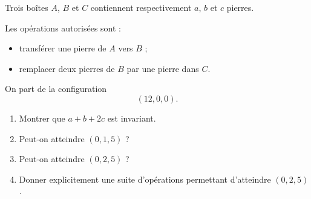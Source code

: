 Trois boîtes $A$, $B$ et $C$ contiennent respectivement $a$, $b$ et $c$
pierres.

Les opérations autorisées sont :
\begin{itemize}
  \item transférer une pierre de $A$ vers $B$ ;
  \item remplacer deux pierres de $B$ par une pierre dans $C$.
\end{itemize}
On part de la configuration
\[
(12, 0, 0).
\]
\begin{enumerate}
  \item Montrer que $a + b + 2c$ est invariant.
  \item Peut-on atteindre $(0, 1, 5)$ ?
  \item Peut-on atteindre $(0, 2, 5)$ ?
  \item Donner explicitement une suite d'opérations permettant d'atteindre
  $(0, 2, 5)$.
\end{enumerate}
